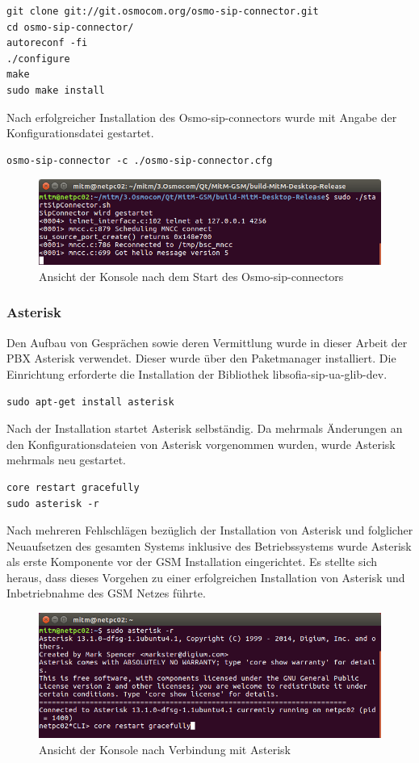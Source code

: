 \begin{lstlisting}
git clone git://git.osmocom.org/osmo-sip-connector.git
cd osmo-sip-connector/
autoreconf -fi
./configure
make
sudo make install
\end{lstlisting} 

Nach erfolgreicher Installation des Osmo-sip-connectors wurde mit Angabe der Konfigurationsdatei gestartet.

\begin{lstlisting}
osmo-sip-connector -c ./osmo-sip-connector.cfg
\end{lstlisting} 

\begin{figure}[h] %
\centering
\includegraphics[width=15cm]{includes/Start_SipConnector}
\caption{Ansicht der Konsole nach dem Start des Osmo-sip-connectors}
\label{fig:Asterisk}
\end{figure}
 
\subsubsection{Asterisk}
Den Aufbau von Gesprächen sowie deren Vermittlung wurde in dieser Arbeit der PBX Asterisk verwendet. Dieser wurde über den Paketmanager installiert. Die Einrichtung erforderte die Installation der Bibliothek libsofia-sip-ua-glib-dev.

\begin{lstlisting}
sudo apt-get install asterisk
\end{lstlisting}

Nach der Installation startet Asterisk selbständig. Da mehrmals Änderungen an den Konfigurationsdateien von Asterisk vorgenommen wurden, wurde Asterisk mehrmals neu gestartet.

\begin{lstlisting}
core restart gracefully
sudo asterisk -r
\end{lstlisting}

Nach mehreren Fehlschlägen bezüglich der Installation von Asterisk und folglicher Neuaufsetzen des gesamten Systems inklusive des Betriebssystems wurde Asterisk als erste Komponente vor der GSM Installation eingerichtet. Es stellte sich heraus, dass dieses Vorgehen zu einer erfolgreichen Installation von Asterisk und Inbetriebnahme des GSM Netzes führte.

\begin{figure}[h] %
\centering
\includegraphics[width=15cm]{includes/Asterisk}
\caption{Ansicht der Konsole nach Verbindung mit Asterisk}
\label{fig:Asterisk}
\end{figure}
